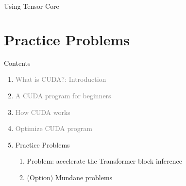 \documentclass[dvipdfmx, 11pt, aspectratio=169]{beamer}   %
\begin{document}
%
%
%
%
\begin{frame}{Using Tensor Core}

\end{frame}
\section{Practice Problems}
\begin{frame}{Contents}
 \begin{enumerate}   %
   \item \textcolor{gray}{What is CUDA?: Introduction}
   \item \textcolor{gray}{A CUDA program for beginners}
   \item \textcolor{gray}{How CUDA works}
   \item \textcolor{gray}{Optimize CUDA program}
   \item Practice Problems
   \begin{enumerate}
     \item Problem: accelerate the Transformer block inference
     \item (Option) Mundane problems
   \end{enumerate}
 \end{enumerate}
\end{frame}
\end{document}
